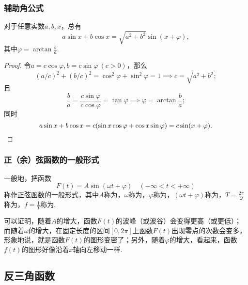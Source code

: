 \subsubsection{辅助角公式}
\begin{theorem}[辅助角公式]
对于任意实数\(a,b,x\)，总有
\begin{equation}
a \sin x + b \cos x = \sqrt{a^2 + b^2} \sin(x + \varphi),
\end{equation}
其中\(\varphi = \arctan\frac{b}{a}\).
\begin{proof}
令\(a = c \cos\varphi,
b = c \sin\varphi\ (c>0)\)，那么
\[
\left(a/c\right)^2+\left(b/c\right)^2
=\cos^2\varphi+\sin^2\varphi
=1
\implies
c = \sqrt{a^2+b^2};
\]
且\[
\frac{b}{a} = \frac{c \sin\varphi}{c \cos\varphi} = \tan\varphi
\implies
\varphi = \arctan\frac{b}{a};
\]
同时
\[
a \sin x + b \cos x
= c (\sin x \cos\varphi + \cos x \sin\varphi)
= c \sin(x+\varphi).
\qedhere
\]
\end{proof}
\end{theorem}

\subsubsection{正（余）弦函数的一般形式}
\begin{definition}
一般地，把函数\[
F(t) = A \sin(\omega t + \varphi) \quad (-\infty<t<+\infty)
\]称作正弦函数的一般形式，其中\(A\)称为，\(\omega\)称为，\(\varphi\)称为，\((\omega t + \varphi)\)称为，\(T = \frac{2\pi}{\omega}\)称为，\(f = \frac{1}{T}\)称为.
\end{definition}
可以证明，随着\(A\)的增大，函数\(F(t)\)的波峰（或波谷）会变得更高（或更低）；而随着\(\omega\)的增大，在固定长度的区间\([0,2\pi]\)上函数\(F(t)\)出现零点的次数会变多，形象地说，就是函数\(F(t)\)的图形变密了；另外，随着\(\varphi\)的增大，看起来，函数\(f(t)\)的图形好像沿着\(x\)轴向左移动一样.

\subsection{反三角函数}

